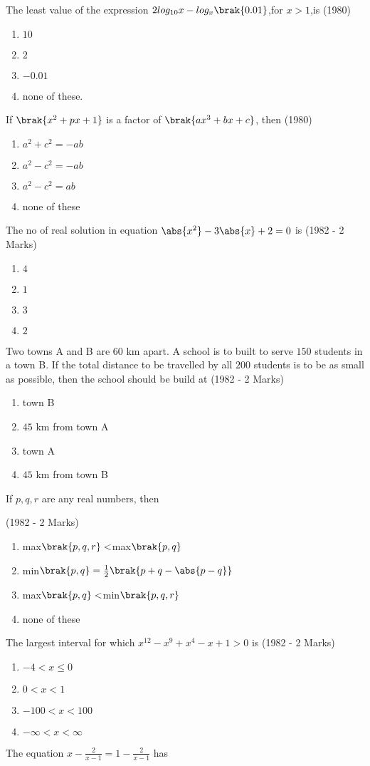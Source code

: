 \item The least value of the expression $2log_{10} x-log_x\brak{0.01}$,for $x>1$,is \hfill (1980)
\begin{enumerate} 
\item $10$
\item $2$
\item $-0.01$
\item none of these.
\end{enumerate}
\item If $\brak{x^2+px+1}$ is a factor of $\brak{ax^3+bx+c}$, then \hfill (1980)
\begin{enumerate} 
\item $a^2+c^2=-ab$
\item $a^2-c^2=-ab$
\item $a^2-c^2=ab$
\item none of these
\end{enumerate}
\item The no of real solution in equation $\abs{x^2}-3\abs{x}+2=0$ is \hfill (1982 - 2 Marks)
\begin{enumerate} 
\item $4$
\item $1$
\item $3$
\item $2$
\end{enumerate}
\item Two towns A and B are $60$ km apart. A school is to built to serve $150$ students in a town B. If the total distance to be travelled by all $200$ students is to be as small as possible, then the school should be build at \hfill (1982 - 2 Marks)
\begin{enumerate}
\item town B
\item $45$ km from town A
\item town A
\item $45$ km from town B
\end{enumerate}
\item If $p,q,r$ are any real numbers, then 

\hfill (1982 - 2 Marks)
\begin{enumerate}
\item max$\brak{p,q,r}<$max$\brak{p,q}$
\item min$\brak{p,q}=\frac{1}{2}\brak{p+q-\abs{p-q}}$
\item max$\brak{p,q}<$min$\brak{p,q,r}$
\item  none of these
\end{enumerate}
\item The largest interval for which $x^{12}-x^9+x^4-x+1>0$ is \hfill (1982 - 2 Marks)
\begin{enumerate}
\item $-4<x\leq0$
\item $0<x<1$
\item $-100<x<100$
\item $-\infty<x<\infty$
\end{enumerate}
\item The equation $x-\frac{2}{x-1}=1-\frac{2}{x-1}$ has

